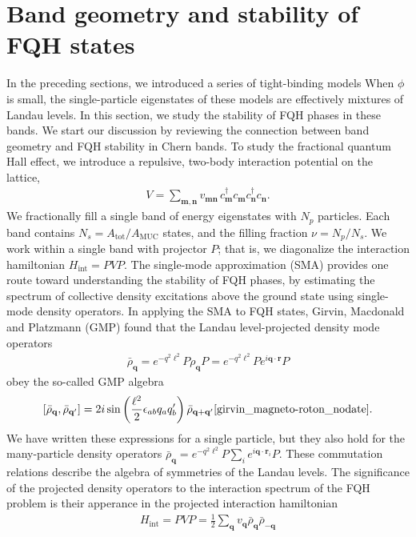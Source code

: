 \documentclass[aps,prb,twocolumn,letterpaper,twoside,nobalancelastpage,groupedaddress,amsmath,amssymb,floatfix,citeautoscript]{revtex4-1}
\begin{document}
\section{Band geometry and stability of FQH states}
In the preceding sections, we introduced a series of tight-binding models When $\phi$ is small, the single-particle eigenstates of these models are effectively mixtures of Landau levels. In this section, we study the stability of FQH phases in these bands. We start our discussion by reviewing the connection between band geometry and FQH stability in Chern bands.
To study the fractional quantum Hall effect, we introduce a repulsive, two-body interaction potential on the lattice,
\begin{align*}
V = \sum_{\mathbf{m},\mathbf{n}}v_{\mathbf{m}\mathbf{n}}\, c^{\dag}_\mathbf{m} c_\mathbf{m} c^{\dag}_\mathbf{n} c_\mathbf{n}.
\end{align*}
We fractionally fill a single band of energy eigenstates with $N_p$ particles. Each band contains $N_s = A_{\text{tot}}/A_{\text{MUC}}$ states, and the filling fraction $\nu = N_p /N_s$. We work within a single band with projector $P$; that is, we diagonalize the interaction hamiltonian $H_{\text{int}} = PVP$. 
The single-mode approximation (SMA) provides one route toward understanding the stability of FQH phases, by estimating the spectrum of collective density excitations above the ground state\cite{girvin_magneto-roton_nodate} using single-mode density operators. In applying the SMA to FQH states, Girvin, Macdonald and Platzmann (GMP) found that the Landau level-projected density mode operators
\begin{align*}
\bar{\rho}_\mathbf{q} = e^{-q^2\ell^2}P\rho_\mathbf{q}P = e^{-q^2\ell^2}Pe^{i\mathbf{q}\cdot \mathbf{r}}P
\end{align*}
 obey the so-called GMP algebra
\begin{align*}
\comm{\bar{\rho}_{\mathbf{q}}}{\bar{\rho}_{\mathbf{q}'}} = 2i\sin\left(\frac{\ell^2}{2}\epsilon_{ab}q_a q'_b\right)\bar{\rho}_{\mathbf{q} +\mathbf{q}'}\cite{girvin_magneto-roton_nodate}.
\end{align*}
We have written these expressions for a single particle, but they also hold for the many-particle density operators $\bar{\rho}_{\mathbf{q}} = e^{-q^2\ell^2}P\sum_{i}e^{i\mathbf{q}\cdot\mathbf{r}_i}P$. These commutation relations describe the algebra of symmetries of the Landau levels. The significance of the projected density operators to the interaction spectrum of the FQH problem is their apperance in the projected interaction hamiltonian
\begin{align*}
H_{\text{int}} = PVP = \frac{1}{2}\sum_{\mathbf{q}} v_{\mathbf{q}} \bar{\rho}_{\mathbf{q}}\bar{\rho}_{-\mathbf{q}}
\end{align*}
\end{document}
